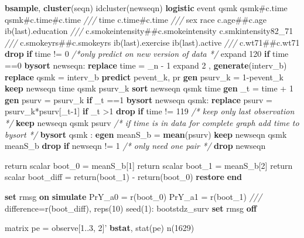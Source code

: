 \documentclass[
  10pt,
]{book}
\newenvironment{Shaded}{\begin{snugshade}}{\end{snugshade}}
\newcommand{\CommentTok}[1]{\textcolor[rgb]{0.56,0.35,0.01}{\textit{#1}}}
\newcommand{\DataTypeTok}[1]{\textcolor[rgb]{0.13,0.29,0.53}{#1}}
\newcommand{\DecValTok}[1]{\textcolor[rgb]{0.00,0.00,0.81}{#1}}
\newcommand{\FunctionTok}[1]{\textcolor[rgb]{0.00,0.00,0.00}{#1}}
\newcommand{\KeywordTok}[1]{\textcolor[rgb]{0.13,0.29,0.53}{\textbf{#1}}}
\newcommand{\NormalTok}[1]{#1}
\begin{document}
\begin{Shaded}
\begin{Highlighting}[]
\KeywordTok{bsample}\NormalTok{, }\KeywordTok{cluster}\NormalTok{(seqn) idcluster(newseqn)  		}
\KeywordTok{logistic}\NormalTok{ event qsmk qsmk#c.time qsmk#c.time#c.time }\CommentTok{///}
\NormalTok{  time c.time#c.time }\CommentTok{///}
\NormalTok{	sex race c.age##c.age ib(}\FunctionTok{last}\NormalTok{).education }\CommentTok{///}
\NormalTok{	c.smokeintensity##c.smokeintensity c.smkintensity82_71 }\CommentTok{///}
\NormalTok{	c.smokeyrs##c.smokeyrs ib(}\FunctionTok{last}\NormalTok{).exercise ib(}\FunctionTok{last}\NormalTok{).active }\CommentTok{///}
\NormalTok{	c.wt71##c.wt71 }
\KeywordTok{drop} \KeywordTok{if}\NormalTok{ time != 0	}
\CommentTok{/*only predict on new version of data */}
\NormalTok{expand 120 }\KeywordTok{if}\NormalTok{ time ==0 }
\KeywordTok{bysort}\NormalTok{ newseqn: }\KeywordTok{replace}\NormalTok{ time = }\DataTypeTok{_n}\NormalTok{ - 1		 		}
\NormalTok{expand 2 , }\KeywordTok{generate}\NormalTok{(interv_b) }
\KeywordTok{replace}\NormalTok{ qsmk = interv_b 		 }
\KeywordTok{predict}\NormalTok{ pevent_k, pr}
\KeywordTok{gen}\NormalTok{ psurv_k = 1-pevent_k}
\KeywordTok{keep}\NormalTok{ newseqn  time qsmk psurv_k 		       	}
\KeywordTok{sort}\NormalTok{ newseqn qsmk time}
\KeywordTok{gen}\NormalTok{ _t = time + 1}
\KeywordTok{gen}\NormalTok{ psurv = psurv_k }\KeywordTok{if}\NormalTok{ _t ==1 	}
\KeywordTok{bysort}\NormalTok{ newseqn  qsmk: }\KeywordTok{replace}\NormalTok{ psurv = psurv_k*psurv[_t-1] }\KeywordTok{if}\NormalTok{ _t >1 }
\KeywordTok{drop}  \KeywordTok{if}\NormalTok{ time != 119   }\CommentTok{/* keep only last observation */}
\KeywordTok{keep}\NormalTok{ newseqn qsmk psurv    }
\CommentTok{/* if time is in data for complete graph add time to bysort */}	
\KeywordTok{bysort}\NormalTok{ qsmk  : }\KeywordTok{egen}\NormalTok{ meanS_b = }\KeywordTok{mean}\NormalTok{(psurv)}
\KeywordTok{keep}\NormalTok{ newseqn qsmk  meanS_b }
\KeywordTok{drop} \KeywordTok{if}\NormalTok{ newseqn != 1  }\CommentTok{/* only need one pair */}
\KeywordTok{drop}\NormalTok{ newseqn 		}
	
\FunctionTok{return} \FunctionTok{scalar}\NormalTok{ boot_0 = meanS_b[1]}
\FunctionTok{return} \FunctionTok{scalar}\NormalTok{ boot_1 = meanS_b[2]}
\FunctionTok{return} \FunctionTok{scalar}\NormalTok{ boot_diff = }\FunctionTok{return}\NormalTok{(boot_1) - }\FunctionTok{return}\NormalTok{(boot_0)}
\KeywordTok{restore}
\KeywordTok{end}

\KeywordTok{set} \DecValTok{rmsg} \KeywordTok{on}
\KeywordTok{simulate}\NormalTok{ PrY_a0 = }\FunctionTok{r}\NormalTok{(boot_0) PrY_a1 = }\FunctionTok{r}\NormalTok{(boot_1) }\CommentTok{///}
\NormalTok{  difference=}\FunctionTok{r}\NormalTok{(boot_diff), reps(10) }\DecValTok{seed}\NormalTok{(1): bootstdz_surv}
\KeywordTok{set} \DecValTok{rmsg} \KeywordTok{off} 
 
\FunctionTok{matrix}\NormalTok{ pe = observe[1..3, 2]'}
\KeywordTok{bstat}\NormalTok{, stat(pe) n(1629)}
\end{Highlighting}
\end{Shaded}
\end{document}
